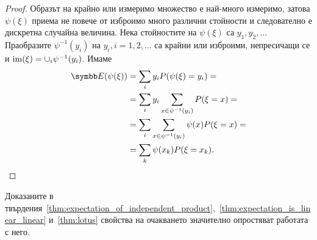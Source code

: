 \documentclass[numbers=endperiod, bibliography=totocnumbered]{scrartcl}
\begin{document}
\begin{proof}
  Образът на крайно или измеримо множество е най-много измеримо, затова \( \psi(\xi) \) приема не повече от изброимо много различни стойности и следователно е дискретна случайна величина. Нека стойностите на \( \psi(\xi) \) са \( y_1, y_2, \ldots \) Праобразите \( \psi^{-1}(y_i) \) на \( y_i, i = 1, 2, \ldots \) са крайни или изброими, непресичащи се и \( \operatorname{im}(\xi) = \cup_i \psi^{-1}(y_i) \). Имаме
  \begin{align*}
    \Expect(\psi(\xi))
    &=
    \sum_i y_i P(\psi(\xi) = y_i)
    = \\ &=
    \sum_i y_i \sum_{x \in \psi^{-1}(y_i)} P(\xi = x)
    = \\ &=
    \sum_i \sum_{x \in \psi^{-1}(y_i)} \psi(x) P(\xi = x)
    = \\ &=
    \sum_k \psi(x_k) P(\xi = x_k).
  \end{align*}
\end{proof}

Доказаните в твърдения~\ref{thm:expectation_of_independent_product},~\ref{thm:expectation_is_linear_linear} и~\ref{thm:lotus} свойства на очакването значително опростяват работата с него.
\end{document}
